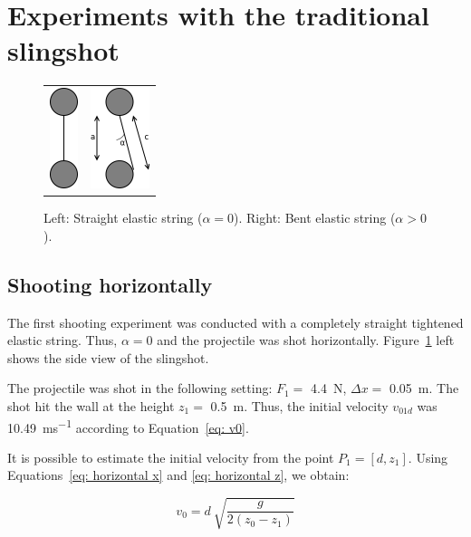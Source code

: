 				
	\section{Experiments with the traditional slingshot}
	
		\begin{figure}[h]
		\centering
		\begin{tabular}{cc}
		\includegraphics[height=111px]{string_horizontal.png}
		&
		\includegraphics[height=111px]{string_upwards.png}
		\end{tabular}
		\caption{Left: Straight elastic string ($ \alpha = 0$). Right: Bent elastic string ($ \alpha > 0$).}
		\label{fig:shooting string}
		\end{figure}		
	
		\subsection{Shooting horizontally}
			The first shooting experiment was conducted with a completely straight tightened elastic string. Thus, $ \alpha = 0$ and the projectile was shot horizontally. Figure~\ref{fig:shooting string}	left shows the side view of the slingshot.
			
			The projectile was shot in the following setting: $ F_1 = $ \SI{4.4}{N}, $ \Delta x = $ \SI{0.05}{m}. The shot hit the wall at the height $ z_1 = $ \SI{0.5}{m}. Thus, the initial velocity $ v_{01d}$ was \SI{10.49}{ms^{-1}} according to Equation~\eqref{eq: v0}.
			
			It is possible to estimate the initial velocity from the point $ P_1 = [d, z_1]$. Using Equations~\eqref{eq: horizontal x} and \eqref{eq: horizontal z}, we obtain:
			
			\begin{equation}
				v_0 = d \: \sqrt{\frac{g}{2(z_0 - z_1)}}
			\end{equation}
			
